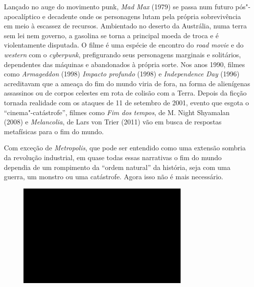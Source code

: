 Lançado no auge do movimento punk, \emph{Mad Max} (1979) se passa num
futuro pós"-apocalíptico e decadente onde os personagens lutam pela
própria sobrevivência em meio à escassez de recursos. Ambientado no
deserto da Austrália, numa terra sem lei nem governo, a gasolina se
torna a principal moeda de troca e é violentamente disputada. O filme é
uma espécie de encontro do \emph{road movie} e do \emph{western} com o
\emph{cyberpunk}, prefigurando seus personagens marginais e solitários,
dependentes das máquinas e abandonados à própria sorte. Nos anos 1990,
filmes como \emph{Armageddon} (1998) \emph{Impacto profundo}
(1998) e \emph{Independence Day} (1996) acreditavam que a ameaça do fim
do mundo viria de fora, na forma de alienígenas assassinos ou de corpos
celestes em rota de colisão com a Terra. Depois da ficção tornada
realidade com os ataques de 11 de setembro de 2001, evento que esgota o
``cinema"-catástrofe'', filmes como \emph{Fim dos tempos}, de M. Night
Shyamalan (2008) e \emph{Melancolia}, de Lars von Trier (2011) vão em
busca de respostas metafísicas para o fim do mundo.

Com exceção de \emph{Metropolis}, que pode ser entendido como uma
extensão sombria da revolução industrial, em quase todas essas
narrativas o fim do mundo dependia de um rompimento da ``ordem natural''
da história, seja com uma guerra, um monstro ou uma
catástrofe. Agora isso não é mais necessário.

\begin{figure}[!ht]
\centering
 \includegraphics[width=85mm]{./imgs/im1.jpg}
\caption{\tiny{}}
\end{figure}

